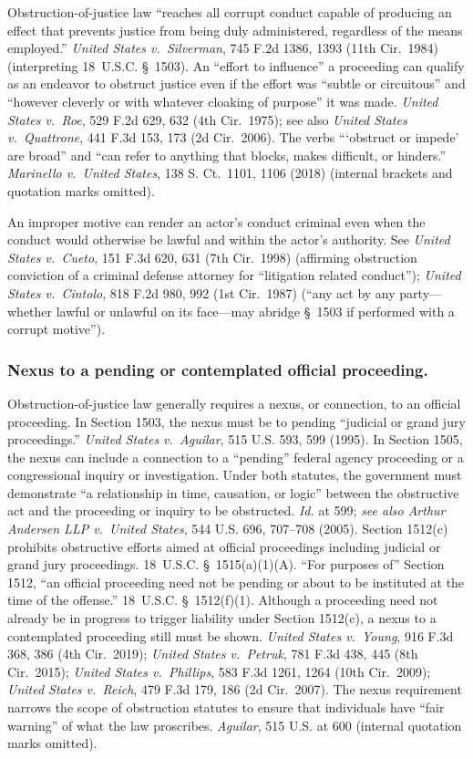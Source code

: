 Obstruction-of-justice law “reaches all corrupt conduct capable of producing an effect that prevents justice from being duly administered, regardless of the means employed.”
\textit{United States v.\ Silverman}, 745 F.2d 1386, 1393 (11th Cir.~1984) (interpreting 18~U.S.C. \S~1503).
An “effort to influence” a proceeding can qualify as an endeavor to obstruct justice even if the effort was “subtle or circuitous” and “however cleverly or with whatever cloaking of purpose” it was made.
\textit{United States v.\ Roe}, 529 F.2d 629, 632 (4th Cir.~1975);
see also \textit{United States v.\ Quattrone}, 441 F.3d 153, 173 (2d Cir.~2006).
The verbs “‘obstruct or impede’ are broad” and “can refer to anything that blocks, makes difficult, or hinders.”
\textit{Marinello v.\ United States}, 138 S. Ct.~1101, 1106 (2018) (internal brackets and quotation marks omitted).

An improper motive can render an actor’s conduct criminal even when the conduct would otherwise be lawful and within the actor’s authority.
See \textit{United States v.\ Cueto}, 151 F.3d 620, 631 (7th Cir.~1998) (affirming obstruction conviction of a criminal defense attorney for “litigation related conduct”); \textit{United States v.\ Cintolo}, 818 F.2d 980, 992 (1st Cir.~1987) (“any act by any party---whether lawful or unlawful on its face---may abridge \S~1503 if performed with a corrupt motive”).

\subsubsection*{Nexus to a pending or contemplated official proceeding.}

Obstruction-of-justice law generally requires a nexus, or connection, to an official proceeding.
In Section 1503, the nexus must be to pending “judicial or grand jury proceedings.”
\textit{United States v.\ Aguilar}, 515 U.S. 593, 599 (1995).
In Section 1505, the nexus can include a connection to a “pending” federal agency proceeding or a congressional inquiry or investigation.
Under both statutes, the government must demonstrate “a relationship in time, causation, or logic” between the obstructive act and the proceeding or inquiry to be obstructed.
\textit{Id.} at 599; \textit{see also Arthur Andersen LLP v.\ United States}, 544 U.S. 696, 707--708 (2005).
Section 1512(c) prohibits obstructive efforts aimed at official proceedings including judicial or grand jury proceedings.
18~U.S.C. \S~1515(a)(1)(A).
“For purposes of” Section 1512, “an official proceeding need not be pending or about to be instituted at the time of the offense.”
18~U.S.C. \S~1512(f)(1).
Although a proceeding need not already be in progress to trigger liability under Section 1512(c), a nexus to a contemplated proceeding still must be shown.
\textit{United States v.\ Young}, 916 F.3d 368, 386 (4th Cir.~2019);
\textit{United States v.\ Petruk}, 781 F.3d 438, 445 (8th Cir.~2015);
\textit{United States v.\ Phillips}, 583 F.3d 1261, 1264 (10th Cir.~2009);
\textit{United States v.\ Reich}, 479 F.3d 179, 186 (2d Cir.~2007).
The nexus requirement narrows the scope of obstruction statutes to ensure that individuals have “fair warning” of what the law proscribes.
\textit{Aguilar}, 515 U.S. at 600 (internal quotation marks omitted).

